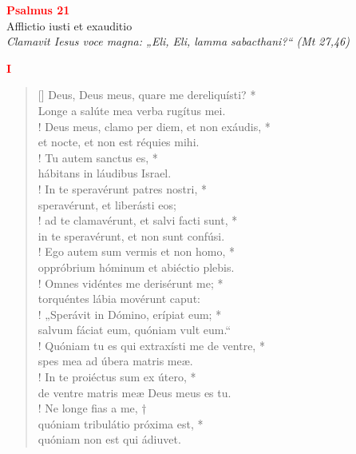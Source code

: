 


\def\greinitialformat#1{%
{\fontsize{39}{39}\selectfont #1}%
}




\vspace{0.3cm}
\begin{center}
 \textcolor{red}{\large \bf Psalmus 21}\\
Afflictio iusti et exauditio\\
\textit{\small Clamavit Iesus voce magna: „Eli, Eli, lamma sabacthani?“ (Mt 27,46)}
\end{center}
\begin{center}
\textcolor{red}{\bf I}
\end{center}
\begin{verse}[\versewidth]
Deus, Deus meus, quare me dereliquísti? *\\
Longe a salúte mea verba rugítus mei.\\!
\vin Deus meus, clamo per diem, et non exáudis, *\\
\vin et nocte, et non est réquies mihi.\\!
Tu autem sanctus es, *\\
hábitans in láudibus Israel.\\!
\vin In te speravérunt patres nostri, *\\
\vin speravérunt, et liberásti eos;\\!
ad te clamavérunt, et salvi facti sunt, *\\
in te speravérunt, et non sunt confúsi.\\!
\vin Ego autem sum vermis et non homo, *\\
\vin oppróbrium hóminum et abiéctio plebis.\\!
Omnes vidéntes me derisérunt me; *\\
torquéntes lábia movérunt caput:\\!
\vin „Sperávit in Dómino, erípiat eum; *\\
\vin salvum fáciat eum, quóniam vult eum.“\\!
Quóniam tu es qui extraxísti me de ventre, *\\
spes mea ad úbera matris meæ.\\!
\vin In te proiéctus sum ex útero, *\\
\vin de ventre matris meæ Deus meus es tu.\\!
Ne longe fias a me, †\\
quóniam tribulátio próxima est, *\\
quóniam non est qui ádiuvet.\\
\end{verse}

